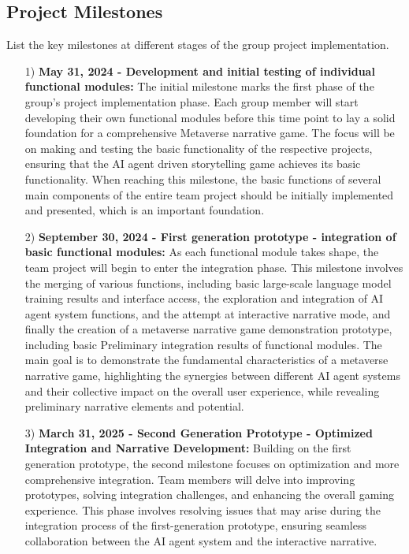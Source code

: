 \subsection{Project Milestones}
List the key milestones at different stages of the group project implementation.

\begin{itemize}
    \item [1)] 
    \textbf{May 31, 2024 - Development and initial testing of individual functional modules:} 
    The initial milestone marks the first phase of the group's project implementation phase. Each group member will start developing their own functional modules before this time point to lay a solid foundation for a comprehensive Metaverse narrative game. 
    The focus will be on making and testing the basic functionality of the respective projects, ensuring that the AI agent driven storytelling game achieves its basic functionality. 
    When reaching this milestone, the basic functions of several main components of the entire team project should be initially implemented and presented, which is an important foundation.
    \item [2)]
    \textbf{September 30, 2024 - First generation prototype - integration of basic functional modules:} 
    As each functional module takes shape, the team project will begin to enter the integration phase. 
    This milestone involves the merging of various functions, including basic large-scale language model training results and interface access, the exploration and integration of AI agent system functions, and the attempt at interactive narrative mode, 
    and finally the creation of a metaverse narrative game demonstration prototype, including basic Preliminary integration results of functional modules. 
    The main goal is to demonstrate the fundamental characteristics of a metaverse narrative game, highlighting the synergies between different AI agent systems and their collective impact on the overall user experience, while revealing preliminary narrative elements and potential.
    \item [3)]
    \textbf{March 31, 2025 - Second Generation Prototype - Optimized Integration and Narrative Development:} 
    Building on the first generation prototype, the second milestone focuses on optimization and more comprehensive integration. 
    Team members will delve into improving prototypes, solving integration challenges, and enhancing the overall gaming experience. 
    This phase involves resolving issues that may arise during the integration process of the first-generation prototype, ensuring seamless collaboration between the AI agent system and the interactive narrative. 

\end{itemize}
